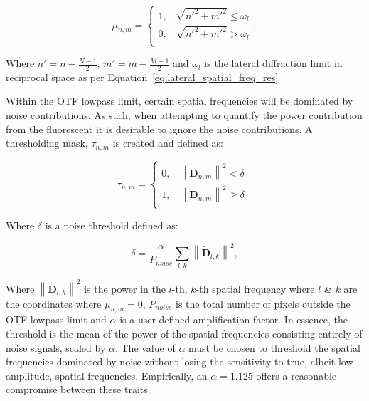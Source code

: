 \begin{equation}\label{eq:circular_mask}
\mu_{n,m} = 
\begin{cases}
1, & \sqrt{n'^{2} + m'^{2}} \le \omega_{l}\\
0, & \sqrt{n'^{2} + m'^{2}} > \omega_{l}\\ 
\end{cases},
\end{equation}

Where $n' = n - \frac{N-1}{2}$, $m' = m - \frac{M-1}{2}$ and $\omega_{l}$ 
is the lateral diffraction limit in reciprocal space as per
Equation~\ref{eq:lateral_spatial_freq_res} 

Within the OTF lowpass limit, certain spatial frequencies will be dominated
by noise contributions. As such, when attempting to quantify the power 
contribution from the fluorescent it is desirable to ignore the noise
contributions. A thresholding mask, $\tau_{n,m}$ is created and defined as:

\begin{equation}\label{eq:noise_threshold_mask}
\tau_{n,m} = 
\begin{cases}
0, & \left\| \tilde{\textbf{D}}_{n,m} \right\|^2 < \delta\\
1, & \left\| \tilde{\textbf{D}}_{n,m} \right\|^2 \ge \delta\\ 
\end{cases},
\end{equation}

Where $\delta$ is a noise threshold defined as:

\begin{equation}\label{eq:noise_threshold}
\delta = \frac{\alpha}{P_{noise}}\sum\limits_{l,k}{\left\| \tilde{\textbf{D}}_{l,k} \right\|^2},
\end{equation}

Where $\left\| \tilde{\textbf{D}}_{l,k} \right\|^2$ is the power in the 
$l$-th, $k$-th spatial frequency where $l$ \& $k$ are the coordinates 
where $\mu_{n,m} = 0$, $P_{noise}$ is the total number of pixels 
outside the OTF lowpass limit and $\alpha$ is a user defined 
amplification factor. In essence, the threshold is the mean of the
power of the spatial frequencies consisting entirely of noise signals,
scaled by $\alpha$.	The value of $\alpha$ must be chosen to threshold
the spatial frequencies dominated by noise without losing the sensitivity
to true, albeit low amplitude, spatial frequencies. Empirically, an 
$\alpha = 1.125$ offers a reasonable compromise between these traits.

